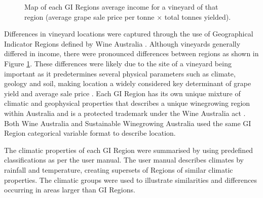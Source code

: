 \documentclass[review,12pt,authoryear]{elsarticle}
\begin{document}
\begin{linenumbers}
\begin{figure}
  \caption{Map of each GI Regions average income for a vineyard of that region (average grape sale price per tonne $\times$ total tonnes yielded).}\label{fig:map}
\end{figure}%

\par
Differences in vineyard locations were captured through the use of Geographical Indicator Regions defined by Wine Australia \citep{hallidayAustralianWineEncyclopedia2009,oliverReviewSoilPhysical2013,soarClimateDriversRed2008}. Although vineyards generally differed in income, there were pronounced differences between regions as shown in Figure \ref{fig:map}. These differences were likely due to the site of a vineyard being important as it predetermines several physical parameters such as climate, geology and soil, making location a widely considered key determinant of grape yield and average sale price \citep{abbalDecisionSupportSystem2016,agostaRegionalClimateVariability2012,fragaMultivariateClusteringViticultural2017}. Each GI Region has its own unique mixture of climatic and geophysical properties that describes a unique winegrowing region within Australia and is a protected trademark under the Wine Australia act \citep{attorney-generalsdepartmentWineAustraliaCorporation2010}. Both Wine Australia and Sustainable Winegrowing Australia used the same GI Region categorical variable format to describe location.
\par
 The climatic properties of each GI Region were summarised by using predefined classifications as per the \citet{sustainablewinegrowingaustraliaSustainableWinegrowingAustralia2021} user manual. The user manual describes climates by rainfall and temperature, creating supersets of Regions of similar climatic properties. The climatic groups were used to illustrate similarities and differences occurring in areas larger than GI Regions.
\par

\end{linenumbers}
\end{document}
